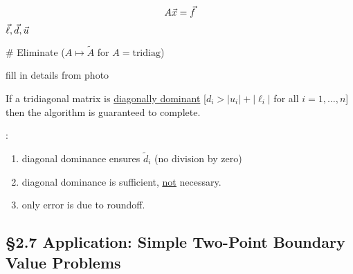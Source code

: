 \documentclass[]{article}
\begin{document}
\begin{theorem}
	$$ A\vec{x} = \vec{f}$$
	$\vec\ell, \vec{d},\vec{u}$

	\# Eliminate ($A\mapsto\tilde A$ for $A= \text{tridiag}$)
\end{theorem}

fill in details from photo

\begin{theorem}
	If a tridiagonal matrix is \ul{diagonally dominant} [$d_i>|u_i|+|\ell_i|$ for all $i=1,\dots,n$] then the algorithm is guaranteed to complete.
\end{theorem}
\begin{note}:
	\begin{enumerate}
		\item diagonal dominance ensures $\tilde d_i$ (no division by zero)
		\item diagonal dominance is sufficient, \ul{\ul{not}} necessary.
		\item only error is due to roundoff.
	\end{enumerate}
\end{note}

\subsection*{\S2.7 Application: Simple Two-Point Boundary Value Problems}
\end{document}
